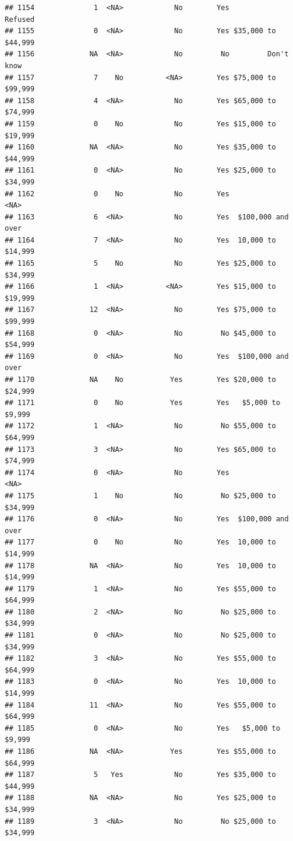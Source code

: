 \documentclass[man]{apa6}
\begin{document}
\begin{verbatim}
## 1154              1  <NA>            No        Yes            Refused
## 1155              0  <NA>            No        Yes $35,000 to $44,999
## 1156             NA  <NA>            No         No         Don't know
## 1157              7    No          <NA>        Yes $75,000 to $99,999
## 1158              4  <NA>            No        Yes $65,000 to $74,999
## 1159              0    No            No        Yes $15,000 to $19,999
## 1160             NA  <NA>            No        Yes $35,000 to $44,999
## 1161              0  <NA>            No        Yes $25,000 to $34,999
## 1162              0    No            No        Yes               <NA>
## 1163              6  <NA>            No        Yes  $100,000 and over
## 1164              7  <NA>            No        Yes  10,000 to $14,999
## 1165              5    No            No        Yes $25,000 to $34,999
## 1166              1  <NA>          <NA>        Yes $15,000 to $19,999
## 1167             12  <NA>            No        Yes $75,000 to $99,999
## 1168              0  <NA>            No         No $45,000 to $54,999
## 1169              0  <NA>            No        Yes  $100,000 and over
## 1170             NA    No           Yes        Yes $20,000 to $24,999
## 1171              0    No           Yes        Yes   $5,000 to $9,999
## 1172              1  <NA>            No         No $55,000 to $64,999
## 1173              3  <NA>            No        Yes $65,000 to $74,999
## 1174              0  <NA>            No        Yes               <NA>
## 1175              1    No            No         No $25,000 to $34,999
## 1176              0  <NA>            No        Yes  $100,000 and over
## 1177              0    No            No        Yes  10,000 to $14,999
## 1178             NA  <NA>            No        Yes  10,000 to $14,999
## 1179              1  <NA>            No        Yes $55,000 to $64,999
## 1180              2  <NA>            No         No $25,000 to $34,999
## 1181              0  <NA>            No         No $25,000 to $34,999
## 1182              3  <NA>            No        Yes $55,000 to $64,999
## 1183              0  <NA>            No        Yes  10,000 to $14,999
## 1184             11  <NA>            No        Yes $55,000 to $64,999
## 1185              0  <NA>            No        Yes   $5,000 to $9,999
## 1186             NA  <NA>           Yes        Yes $55,000 to $64,999
## 1187              5   Yes            No        Yes $35,000 to $44,999
## 1188             NA  <NA>            No        Yes $25,000 to $34,999
## 1189              3  <NA>            No         No $25,000 to $34,999

\end{verbatim}
\end{document}
